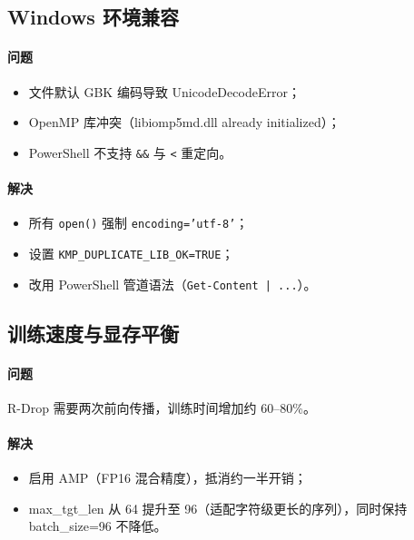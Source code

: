 \documentclass[12pt, a4paper]{ctexart}
\begin{document}
\subsection{Windows 环境兼容}

\paragraph{问题}
\begin{itemize}[nosep]
  \item 文件默认 GBK 编码导致 UnicodeDecodeError；
  \item OpenMP 库冲突（libiomp5md.dll already initialized）；
  \item PowerShell 不支持 \texttt{\&\&} 与 \texttt{<} 重定向。
\end{itemize}

\paragraph{解决}
\begin{itemize}[nosep]
  \item 所有 \texttt{open()} 强制 \texttt{encoding='utf-8'}；
  \item 设置 \texttt{KMP\_DUPLICATE\_LIB\_OK=TRUE}；
  \item 改用 PowerShell 管道语法（\texttt{Get-Content | ...}）。
\end{itemize}

\subsection{训练速度与显存平衡}

\paragraph{问题} R-Drop 需要两次前向传播，训练时间增加约 60--80\%。

\paragraph{解决}
\begin{itemize}[nosep]
  \item 启用 AMP（FP16 混合精度），抵消约一半开销；
  \item max\_tgt\_len 从 64 提升至 96（适配字符级更长的序列），同时保持 batch\_size=96 不降低。
\end{itemize}

\end{document}
